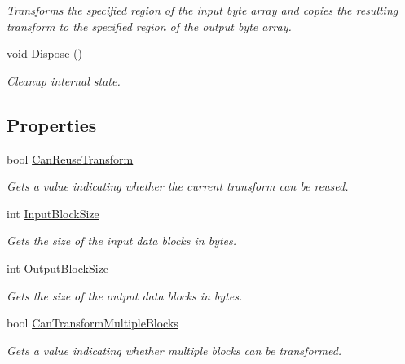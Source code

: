 \begin{DoxyCompactItemize}
\begin{DoxyCompactList}\small\item\em Transforms the specified region of the input byte array and copies the resulting transform to the specified region of the output byte array. \end{DoxyCompactList}\item 
void \hyperlink{class_i_c_sharp_code_1_1_sharp_zip_lib_1_1_encryption_1_1_pkzip_classic_encrypt_crypto_transform_a1bce7b77d9ddb31a669bee6547167118}{Dispose} ()
\begin{DoxyCompactList}\small\item\em Cleanup internal state. \end{DoxyCompactList}\end{DoxyCompactItemize}
\subsection*{Properties}
\begin{DoxyCompactItemize}
\item 
bool \hyperlink{class_i_c_sharp_code_1_1_sharp_zip_lib_1_1_encryption_1_1_pkzip_classic_encrypt_crypto_transform_ac1dee26a5f8851f3d34fdc1408ba4cc4}{Can\+Reuse\+Transform}
\begin{DoxyCompactList}\small\item\em Gets a value indicating whether the current transform can be reused. \end{DoxyCompactList}\item 
int \hyperlink{class_i_c_sharp_code_1_1_sharp_zip_lib_1_1_encryption_1_1_pkzip_classic_encrypt_crypto_transform_ac60b0982f8c21e66e5e6b158878341f5}{Input\+Block\+Size}
\begin{DoxyCompactList}\small\item\em Gets the size of the input data blocks in bytes. \end{DoxyCompactList}\item 
int \hyperlink{class_i_c_sharp_code_1_1_sharp_zip_lib_1_1_encryption_1_1_pkzip_classic_encrypt_crypto_transform_aea7e6ec87bab679c5360bfd589c55068}{Output\+Block\+Size}
\begin{DoxyCompactList}\small\item\em Gets the size of the output data blocks in bytes. \end{DoxyCompactList}\item 
bool \hyperlink{class_i_c_sharp_code_1_1_sharp_zip_lib_1_1_encryption_1_1_pkzip_classic_encrypt_crypto_transform_a74bf327e582f3c7c1925b41b9b7a7857}{Can\+Transform\+Multiple\+Blocks}
\begin{DoxyCompactList}\small\item\em Gets a value indicating whether multiple blocks can be transformed. \end{DoxyCompactList}\end{DoxyCompactItemize}
